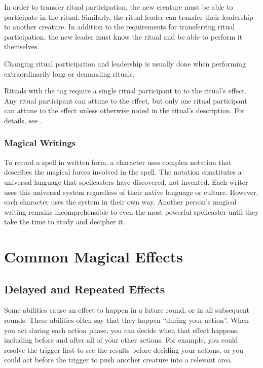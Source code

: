             In order to transfer ritual participation, the new creature must be able to participate in the ritual.
            Similarly, the ritual leader can transfer their leadership to another creature.
            In addition to the requirements for transferring ritual participation, the new leader must know the ritual and be able to perform it themselves.

            Changing ritual participation and leadership is usually done when performing extraordinarily long or demanding rituals.

                Rituals with the  tag require a single ritual participant to  to the ritual's effect.
                Any ritual participant can attune to the effect, but only one ritual participant can attune to the effect unless otherwise noted in the ritual's description.
                For details, see .

        \subsubsection{Magical Writings}
            To record a spell in written form, a character uses complex notation that describes the magical forces involved in the spell.
            The notation constitutes a universal language that spellcasters have discovered, not invented.
            Each writer uses this universal system regardless of their native language or culture.
            However, each character uses the system in their own way.
            Another person's magical writing remains incomprehensible to even the most powerful spellcaster until they take the time to study and decipher it.

\section{Common Magical Effects}
    \subsection{Delayed and Repeated Effects}\label{Delayed and Repeated Effects}
        Some abilities cause an effect to happen in a future round, or in all subsequent rounds.
        These abilities often say that they happen ``during your action''.
        When you act during each action phase, you can decide when that effect happens, including before and after all of your other actions.
        For example, you could resolve the trigger first to see the results before deciding your actions, or you could act before the trigger to push another creature into a relevant area.

